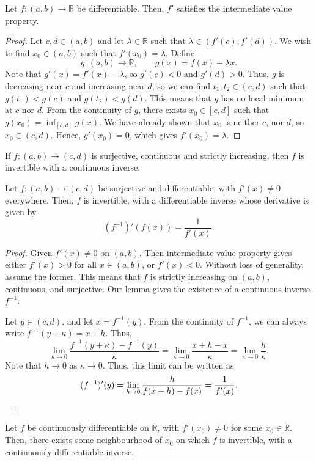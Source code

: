 \documentclass[11pt]{article}
\def\R{\mathbb{R}}
\theoremstyle{definition}
\theoremstyle{remark}
\numberwithin{equation}{module}
\begin{document}
    \begin{theorem}
        Let $f\colon (a, b)\to \R$ be differentiable. Then, $f'$ satisfies the
        intermediate value property.
    \end{theorem}
    \begin{proof}
        Let $c, d \in (a, b)$ and let $\lambda \in \R$ such that $\lambda \in
        (f'(c), f'(d))$. We wish to find $x_0 \in (a, b)$ such that $f'(x_0) =
        \lambda$. Define \[
            g\colon (a, b) \to \R, \qquad g(x) = f(x) - \lambda x.
        \] Note that $g'(x) = f'(x) - \lambda$, so $g'(c) < 0$ and $g'(d) > 0$.
        Thus, $g$ is decreasing near $c$ and increasing near $d$, so we can find
        $t_1, t_2 \in (c, d)$ such that $g(t_1) < g(c)$ and $g(t_2) < g(d)$.
        This means that $g$ has no local minimum at $c$ nor $d$. From the continuity
        of $g$, there exists $x_0 \in [c, d]$ such that $g(x_0) = \inf_{[c, d]}
        g(x)$. We have already shown that $x_0$ is neither $c$, nor $d$, so $x_0 \in
        (c, d)$. Hence, $g'(x_0) = 0$, which gives $f'(x_0) = \lambda$.
    \end{proof}
    
    \begin{lemma}
        If $f\colon (a, b) \to (c, d)$ is surjective, continuous and
        strictly increasing, then $f$ is invertible with a continuous inverse.
    \end{lemma}
    \begin{theorem}
        Let $f\colon (a, b) \to (c, d)$ be surjective and differentiable, with 
        $f'(x) \neq 0$ everywhere. Then, $f$ is invertible, with a differentiable 
        inverse whose derivative is given by \[
            (f^{-1})'(f(x)) = \frac{1}{f'(x)}.
        \] 
    \end{theorem}
    \begin{proof}
        Given $f'(x) \neq 0$ on $(a, b)$. Then intermediate value property gives
        either $f'(x) > 0$ for all $x \in (a, b)$, or $f'(x) < 0$. Without loss of
        generality, assume the former. This means that $f$ is strictly increasing on
        $(a, b)$, continuous, and surjective. Our lemma gives the existence of a
        continuous inverse $f^{-1}$.

        Let $y \in (c, d)$, and let $x = f^{-1}(y)$. From the continuity of
        $f^{-1}$, we can always write $f^{-1}(y + \kappa) = x + h$. Thus, \[
            \lim_{\kappa \to 0} \frac{f^{-1}(y + \kappa) - f^{-1}(y)}{\kappa} =
            \lim_{\kappa \to 0} \frac{x + h - x}{\kappa} = \lim_{\kappa \to 0}
            \frac{h}{\kappa}.
        \] Note that $h \to 0$ as $\kappa \to 0$. Thus, this limit can be written as
        \[
            (f^{-1})'(y) = \lim_{h \to 0} \frac{h}{f(x + h) - f(x)} =
            \frac{1}{f'(x)}. \qedhere
        \]
    \end{proof}
    \begin{corollary}
        Let $f$ be continuously differentiable on $\R$, with $f'(x_0) \neq 0$ for
        some $x_0 \in \R$. Then, there exists some neighbourhood of $x_0$ on which
        $f$ is invertible, with a continuously differentiable inverse.
    \end{corollary}
\end{document}
